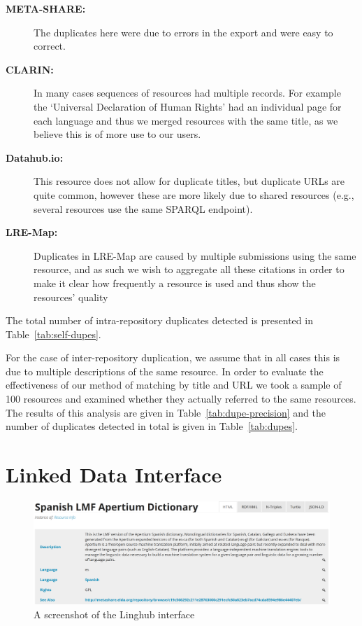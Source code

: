 \documentclass[smallextended]{svjour3}       %
\begin{document}
\begin{description}
    \item[\textbf{META-SHARE:}] The duplicates here were due to errors in the export and
        were easy to correct.
    \item[\textbf{CLARIN:}] In many cases sequences of resources had multiple records. For
        example the `Universal Declaration of Human Rights' had an individual
        page for each language and thus we merged resources with the same title,
        as we believe this is of more use to our users.
    \item[\textbf{Datahub.io:}] This resource does not allow for duplicate titles, but
        duplicate URLs are quite common, however these are more likely due to
        shared resources (e.g., several resources use the same SPARQL endpoint).
    \item[\textbf{LRE-Map:}] Duplicates in LRE-Map are caused by multiple submissions
        using the same resource, and as such we wish to aggregate all these
        citations in order to make it clear how frequently a resource is used
        and thus show the resources' quality
\end{description}

The total number of intra-repository duplicates detected is presented in Table~\ref{tab:self-dupes}.

For the case of inter-repository duplication, we assume that in all cases this
is due to multiple descriptions of the same resource. In order to evaluate the
effectiveness of our method of matching by title and URL we took a sample of 100
resources and examined whether they actually referred to the same resources. The
results of this analysis are given in Table~\ref{tab:dupe-precision} and the number of duplicates detected in total is given in Table~\ref{tab:dupes}.


\section{Linked Data Interface}
\label{linked-data-interface}


\begin{figure}
\includegraphics[width=\textwidth]{linghub-screenshot.png}
\caption{A screenshot of the Linghub interface\label{fig:screenshot}}
\end{figure}
\end{document}
